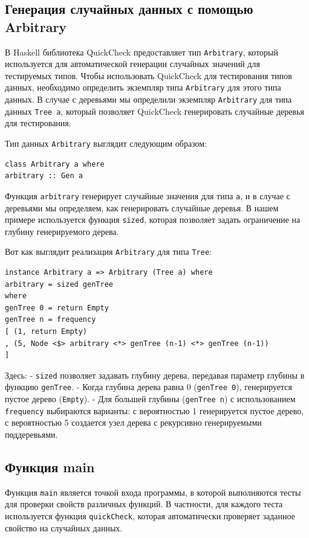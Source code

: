 \documentclass[11pt,a4paper,final]{article} %
\begin{document}
\subsection{Генерация случайных данных с помощью Arbitrary}

В Haskell библиотека QuickCheck предоставляет тип \texttt{Arbitrary}, который используется для автоматической генерации случайных значений для тестируемых типов. Чтобы использовать QuickCheck для тестирования типов данных, необходимо определить экземпляр типа \texttt{Arbitrary} для этого типа данных. В случае с деревьями мы определили экземпляр \texttt{Arbitrary} для типа данных \texttt{Tree a}, который позволяет QuickCheck генерировать случайные деревья для тестирования.

Тип данных \texttt{Arbitrary} выглядит следующим образом:

\begin{lstlisting}[caption={Интерфейс типа Arbitrary}, label={lst:l7}]
class Arbitrary a where
arbitrary :: Gen a
\end{lstlisting}

Функция \texttt{arbitrary} генерирует случайные значения для типа \texttt{a}, и в случае с деревьями мы определяем, как генерировать случайные деревья. В нашем примере используется функция \texttt{sized}, которая позволяет задать ограничение на глубину генерируемого дерева.

Вот как выглядит реализация \texttt{Arbitrary} для типа \texttt{Tree}:

\begin{lstlisting}[caption={Определение Arbitrary для типа Tree}, label={lst:l8}]
instance Arbitrary a => Arbitrary (Tree a) where
arbitrary = sized genTree
where
genTree 0 = return Empty
genTree n = frequency
[ (1, return Empty)
, (5, Node <$> arbitrary <*> genTree (n-1) <*> genTree (n-1))
]
\end{lstlisting}

Здесь:
- \texttt{sized} позволяет задавать глубину дерева, передавая параметр глубины в функцию \texttt{genTree}.
- Когда глубина дерева равна 0 (\texttt{genTree 0}), генерируется пустое дерево (\texttt{Empty}).
- Для большей глубины (\texttt{genTree n}) с использованием \texttt{frequency} выбираются варианты: с вероятностью 1 генерируется пустое дерево, с вероятностью 5 создается узел дерева с рекурсивно генерируемыми поддеревьями.

\subsection{Функция main}
Функция \texttt{main} является точкой входа программы, в которой выполняются тесты для проверки свойств различных функций. В частности, для каждого теста используется функция \texttt{quickCheck}, которая автоматически проверяет заданное свойство на случайных данных.
\end{document}
